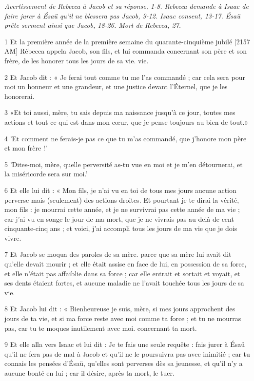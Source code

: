 
\par \textit{Avertissement de Rebecca à Jacob et sa réponse, 1-8. Rebecca demande à Isaac de faire jurer à Ésaü qu'il ne blessera pas Jacob, 9-12. Isaac consent, 13-17. Ésaü prête serment ainsi que Jacob, 18-26. Mort de Rebecca, 27.}

\par 1 Et la première année de la première semaine du quarante-cinquième jubilé [2157 AM] Rébecca appela Jacob, son fils, et lui commanda concernant son père et son frère, de les honorer tous les jours de sa vie. vie.
\par 2 Et Jacob dit : « Je ferai tout comme tu me l'as commandé ; car cela sera pour moi un honneur et une grandeur, et une justice devant l'Éternel, que je les honorerai.
\par 3 «Et toi aussi, mère, tu sais depuis ma naissance jusqu'à ce jour, toutes mes actions et tout ce qui est dans mon cœur, que je pense toujours au bien de tout.»
\par 4 'Et comment ne ferais-je pas ce que tu m'as commandé, que j'honore mon père et mon frère !'
\par 5 'Dites-moi, mère, quelle perversité as-tu vue en moi et je m'en détournerai, et la miséricorde sera sur moi.'
\par 6 Et elle lui dit : « Mon fils, je n'ai vu en toi de tous mes jours aucune action perverse mais (seulement) des actions droites. Et pourtant je te dirai la vérité, mon fils : je mourrai cette année, et je ne survivrai pas cette année de ma vie ; car j'ai vu en songe le jour de ma mort, que je ne vivrais pas au-delà de cent cinquante-cinq ans ; et voici, j'ai accompli tous les jours de ma vie que je dois vivre.
\par 7 Et Jacob se moqua des paroles de sa mère. parce que sa mère lui avait dit qu'elle devait mourir ; et elle était assise en face de lui, en possession de sa force, et elle n'était pas affaiblie dans sa force ; car elle entrait et sortait et voyait, et ses dents étaient fortes, et aucune maladie ne l'avait touchée tous les jours de sa vie.
\par 8 Et Jacob lui dit : « Bienheureuse je suis, mère, si mes jours approchent des jours de ta vie, et si ma force reste avec moi comme ta force ; et tu ne mourras pas, car tu te moques inutilement avec moi. concernant ta mort.
\par 9 Et elle alla vers Isaac et lui dit : Je te fais une seule requête : fais jurer à Ésaü qu'il ne fera pas de mal à Jacob et qu'il ne le poursuivra pas avec inimitié ; car tu connais les pensées d'Ésaü, qu'elles sont perverses dès sa jeunesse, et qu'il n'y a aucune bonté en lui ; car il désire, après ta mort, le tuer.
